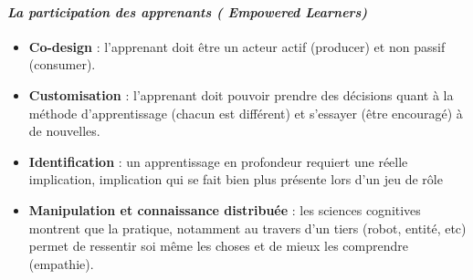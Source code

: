			\paragraph{\emph{La participation des apprenants ( Empowered Learners)}}
			\begin{itemize}
				\item {\textbf{Co-design}} : l'apprenant doit être un acteur actif (producer) et non passif (consumer).
				\item {\textbf{Customisation}} : l'apprenant doit pouvoir prendre des décisions quant à la méthode d'apprentissage (chacun est différent) et s'essayer (être encouragé) à de nouvelles.
				\item {\textbf{Identification}} : un apprentissage en profondeur requiert une réelle implication, implication qui se fait bien plus présente lors d'un jeu de rôle
				\item {\textbf{Manipulation et connaissance distribuée}} : les sciences cognitives montrent que la pratique, notamment au travers d'un tiers (robot, entité, etc) permet de ressentir soi
même les choses et de mieux les comprendre (empathie).
			\end{itemize}

